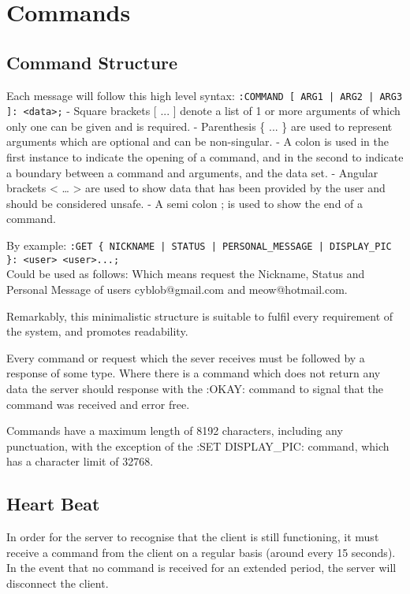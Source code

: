 \section{Commands}

\subsection{Command Structure}

Each message will follow this high level syntax:
\texttt{:COMMAND [ ARG1 | ARG2 | ARG3 ]: <data>;}
- Square brackets [ ... ] denote a list of 1 or more arguments of which only one can be given and is required.  
- Parenthesis \{ ... \} are used to represent arguments which are optional and can be non-singular.
- A colon is used in the first instance to indicate the opening of a command, and in the second to indicate a boundary between a command and arguments, and the data set.
- Angular brackets < … > are used to show data that has been provided by the user and should be considered unsafe.
- A semi colon ; is used to show the end of a command.

By example:
\texttt{:GET \{ NICKNAME | STATUS | PERSONAL_MESSAGE | DISPLAY_PIC \}: <user> <user>...;}\\
Could be used as follows:
Which means request the Nickname, Status and Personal Message of users cyblob@gmail.com and meow@hotmail.com.

Remarkably, this minimalistic structure is suitable to fulfil every requirement of the system, and promotes readability.

Every command or request which the sever receives must be followed by a response of some type. Where there is a command which does not return any data the server should response with the :OKAY: command to signal that the command was received and error free.

Commands have a maximum length of 8192 characters, including any punctuation, with the exception of the :SET DISPLAY_PIC: command, which has a character limit of 32768.

\subsection{Heart Beat}

In order for the server to recognise that the client is still functioning, it must receive a command from the client on a regular basis (around every 15 seconds). In the event that no command is received for an extended period, the server will disconnect the client.

